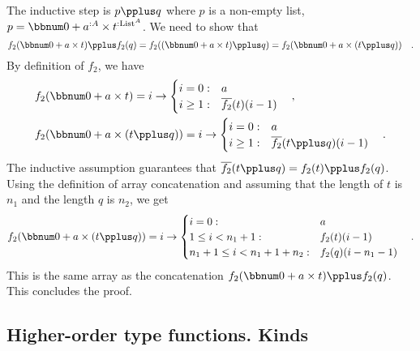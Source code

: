The inductive step is $p\pplus q$ where $p$ is a non-empty list,
$p=\bbnum 0+a^{:A}\times t^{:\text{List}^{A}}$. We need to show that
\[
f_{2}(\bbnum 0+a\times t)\pplus f_{2}(q)=f_{2}((\bbnum 0+a\times t)\pplus q)=f_{2}(\bbnum 0+a\times(t\pplus q))\quad.
\]
By definition of $f_{2}$, we have
\begin{align*}
 & f_{2}(\bbnum 0+a\times t)=i\rightarrow\begin{cases}
i=0: & a\\
i\geq1: & \overline{f_{2}}(t)(i-1)
\end{cases}\quad,\\
 & f_{2}(\bbnum 0+a\times(t\pplus q))=i\rightarrow\begin{cases}
i=0: & a\\
i\geq1: & \overline{f_{2}}(t\pplus q)(i-1)
\end{cases}\quad.
\end{align*}
The inductive assumption guarantees that $\overline{f_{2}}(t\pplus q)=f_{2}(t)\pplus f_{2}(q)$.
Using the definition of array concatenation and assuming that the
length of $t$ is $n_{1}$ and the length $q$ is $n_{2}$, we get
\[
f_{2}(\bbnum 0+a\times(t\pplus q))=i\rightarrow\begin{cases}
i=0: & a\\
1\leq i<n_{1}+1: & f_{2}(t)(i-1)\\
n_{1}+1\leq i<n_{1}+1+n_{2}: & f_{2}(q)(i-n_{1}-1)
\end{cases}\quad.
\]
This is the same array as the concatenation $f_{2}(\bbnum 0+a\times t)\pplus f_{2}(q)$.
This concludes the proof.

\subsection{Higher-order type functions. Kinds}

